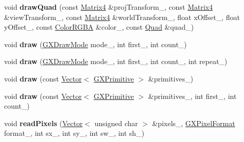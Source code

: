 \begin{DoxyCompactItemize}
\item 
void {\bfseries draw\+Quad} (const \hyperlink{class_i_dream_sky_1_1_matrix4}{Matrix4} \&proj\+Transform\+\_\+, const \hyperlink{class_i_dream_sky_1_1_matrix4}{Matrix4} \&view\+Transform\+\_\+, const \hyperlink{class_i_dream_sky_1_1_matrix4}{Matrix4} \&world\+Transform\+\_\+, float x\+Offset\+\_\+, float y\+Offset\+\_\+, const \hyperlink{class_i_dream_sky_1_1_color_r_g_b_a}{Color\+R\+G\+BA} \&color\+\_\+, const \hyperlink{class_i_dream_sky_1_1_g_x_context_1_1_quad}{Quad} \&quad\+\_\+)\hypertarget{class_i_dream_sky_1_1_g_x_context_a04056dba5fcc5f91fb04f8c5e4b26cf3}{}\label{class_i_dream_sky_1_1_g_x_context_a04056dba5fcc5f91fb04f8c5e4b26cf3}

\item 
void {\bfseries draw} (\hyperlink{class_i_dream_sky_1_1_g_x_draw_mode}{G\+X\+Draw\+Mode} mode\+\_\+, int first\+\_\+, int count\+\_\+)\hypertarget{class_i_dream_sky_1_1_g_x_context_ae27d95e3c25caf09b3d131d2597bfd90}{}\label{class_i_dream_sky_1_1_g_x_context_ae27d95e3c25caf09b3d131d2597bfd90}

\item 
void {\bfseries draw} (\hyperlink{class_i_dream_sky_1_1_g_x_draw_mode}{G\+X\+Draw\+Mode} mode\+\_\+, int first\+\_\+, int count\+\_\+, int repeat\+\_\+)\hypertarget{class_i_dream_sky_1_1_g_x_context_a14ca0a530488d8512039d181580aed58}{}\label{class_i_dream_sky_1_1_g_x_context_a14ca0a530488d8512039d181580aed58}

\item 
void {\bfseries draw} (const \hyperlink{class_i_dream_sky_1_1_vector}{Vector}$<$ \hyperlink{class_i_dream_sky_1_1_g_x_primitive}{G\+X\+Primitive} $>$ \&primitives\+\_\+)\hypertarget{class_i_dream_sky_1_1_g_x_context_aae81ab3576f73498f1f883746cfe3fb8}{}\label{class_i_dream_sky_1_1_g_x_context_aae81ab3576f73498f1f883746cfe3fb8}

\item 
void {\bfseries draw} (const \hyperlink{class_i_dream_sky_1_1_vector}{Vector}$<$ \hyperlink{class_i_dream_sky_1_1_g_x_primitive}{G\+X\+Primitive} $>$ \&primitives\+\_\+, int first\+\_\+, int count\+\_\+)\hypertarget{class_i_dream_sky_1_1_g_x_context_a622043bce177941e13e36c8184a15631}{}\label{class_i_dream_sky_1_1_g_x_context_a622043bce177941e13e36c8184a15631}

\item 
void {\bfseries read\+Pixels} (\hyperlink{class_i_dream_sky_1_1_vector}{Vector}$<$ unsigned char $>$ \&pixels\+\_\+, \hyperlink{class_i_dream_sky_1_1_g_x_pixel_format}{G\+X\+Pixel\+Format} format\+\_\+, int sx\+\_\+, int sy\+\_\+, int sw\+\_\+, int sh\+\_\+)\hypertarget{class_i_dream_sky_1_1_g_x_context_a183d1df7d5f46612d76f894124b449c1}{}\label{class_i_dream_sky_1_1_g_x_context_a183d1df7d5f46612d76f894124b449c1}


\end{DoxyCompactItemize}
